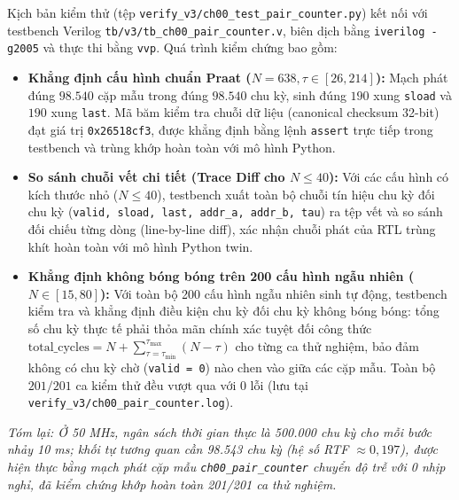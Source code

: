 Kịch bản kiểm thử (tệp \texttt{verify\_v3/}\linebreak[0]\texttt{ch00\_test\_}\linebreak[0]\texttt{pair\_counter.py}) kết nối với testbench Verilog \texttt{tb/v3/}\linebreak[0]\texttt{tb\_ch00\_pair\_counter.v}, biên dịch bằng \texttt{iverilog -g2005} và thực thi bằng \texttt{vvp}. Quá trình kiểm chứng bao gồm:
\begin{itemize}[leftmargin=1.5em, itemsep=2pt]
    \item \textbf{Khẳng định cấu hình chuẩn Praat ($N=638, \tau \in [26, 214]$):} Mạch phát đúng $98.540$ cặp mẫu trong đúng $98.540$ chu kỳ, sinh đúng $190$ xung \texttt{sload} và $190$ xung \texttt{last}. Mã băm kiểm tra chuỗi dữ liệu (canonical checksum 32-bit) đạt giá trị \texttt{0x26518cf3}, được khẳng định bằng lệnh \texttt{assert} trực tiếp trong testbench và trùng khớp hoàn toàn với mô hình Python.
    \item \textbf{So sánh chuỗi vết chi tiết (Trace Diff cho $N \le 40$):} Với các cấu hình có kích thước nhỏ ($N \le 40$), testbench xuất toàn bộ chuỗi tín hiệu chu kỳ đối chu kỳ (\texttt{valid, sload, last, addr\_a, addr\_b, tau}) ra tệp vết và so sánh đối chiếu từng dòng (line-by-line diff), xác nhận chuỗi phát của RTL trùng khít hoàn toàn với mô hình Python twin.
    \item \textbf{Khẳng định không bóng bóng trên 200 cấu hình ngẫu nhiên ($N \in [15, 80]$):} Với toàn bộ 200 cấu hình ngẫu nhiên sinh tự động, testbench kiểm tra và khẳng định điều kiện chu kỳ đối chu kỳ không bóng bóng: tổng số chu kỳ thực tế phải thỏa mãn chính xác tuyệt đối công thức $\text{total\_cycles} = N + \sum_{\tau=\tau_{\min}}^{\tau_{\max}} (N - \tau)$ cho từng ca thử nghiệm, bảo đảm không có chu kỳ chờ (\texttt{valid = 0}) nào chen vào giữa các cặp mẫu. Toàn bộ $201/201$ ca kiểm thử đều vượt qua với 0 lỗi (lưu tại \texttt{verify\_v3/ch00\_pair\_counter.log}).
\end{itemize}

\textit{Tóm lại: Ở 50 MHz, ngân sách thời gian thực là 500.000 chu kỳ cho mỗi bước nhảy 10 ms; khối tự tương quan cần 98.543 chu kỳ (hệ số RTF $\approx 0{,}197$), được hiện thực bằng mạch phát cặp mẫu \texttt{ch00\_pair\_counter} chuyển độ trễ với 0 nhịp nghỉ, đã kiểm chứng khớp hoàn toàn 201/201 ca thử nghiệm.}

